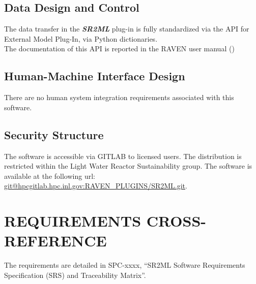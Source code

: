\subsection{Data Design and Control}
The data transfer in the \textbf{\textit{SR2ML}}  plug-in is fully standardized via the API for External Model Plug-In, via
Python dictionaries.
\\The documentation of this  API is reported in the RAVEN user manual (\cite{RAVENuserManual})

\subsection{Human-Machine Interface Design}
 There are no human system integration requirements associated with this software.

 \subsection{Security Structure}


The software is accessible via GITLAB to licensed users. The distribution is restricted within the Light Water Reactor Sustainability group.
The software is available at the following url: \url{git@hpcgitlab.hpc.inl.gov:RAVEN_PLUGINS/SR2ML.git}.

 \section{REQUIREMENTS CROSS-REFERENCE}
The requirements are detailed in SPC-xxxx, ``SR2ML Software Requirements Specification (SRS) and Traceability Matrix''.
